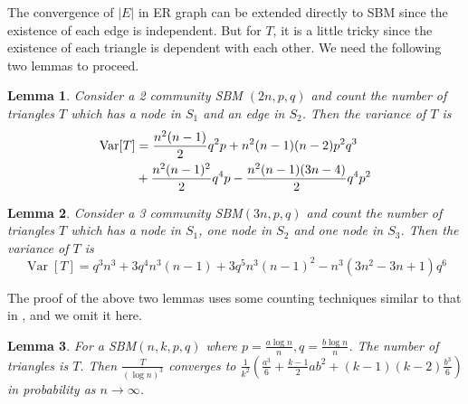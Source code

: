 \documentclass[journal]{IEEEtran}
\newtheorem{lemma}{Lemma}
\newcommand{\1}{\mathbbm{1}}
\DeclareMathOperator{\Var}{Var}
\begin{document}
The convergence of $|E|$ in ER graph can be extended directly to SBM since the existence of each edge is independent.
But for $T$, it is a little tricky since the existence of each triangle is dependent with each other.  We need the following two lemmas
to proceed.
\begin{lemma}\label{lem:SBM_tr_counting_cross}
	Consider a 2 community SBM $(2n, p, q)$ and count the number of triangles $T$ which has a node in $S_1$ and an edge in $S_2$.
Then the variance of $T$ is
\begin{align}
\Var[T] & = \frac{n^2(n-1)}{2}q^2p + n^2(n-1)(n-2)p^2q^3 \notag \\
& + \frac{n^2(n-1)^2}{2}q^4p - \frac{n^2(n-1)(3n-4)}{2}q^4 p^2 \label{eq:SBM_tr_counting_cross}
\end{align}
\end{lemma}
\begin{lemma}\label{lem:SBM_tr_counting_3}
	Consider a 3 community SBM$(3n, p, q)$ and count the number of triangles $T$ which has a node in $S_1$, one node in $S_2$ and one node in $S_3$.
	Then the variance of $T$ is
	\begin{equation*}\label{eq:SBM_tr_counting_three}
	\Var[T] = q^3 n^3 + 3q^4 n^3(n-1) + 3q^5 n^3 (n-1)^2 - n^3(3n^2-3n+1)q^6
	\end{equation*}
\end{lemma}
The proof of the above two lemmas uses some counting techniques similar to that in \cite{holland1977method}, and we omit it here.
\begin{lemma}\label{lem:sbmV}
	For a SBM$(n, k, p, q)$ where $p=\frac{a\log n}{n}, q = \frac{b\log n}{n}$. The number of triangles is $T$.
	Then $\frac{T}{(\log n)^3}$ converges to $\frac{1}{k^2}(\frac{a^3}{6} + \frac{k-1}{2}ab^2 + (k-1)(k-2)\frac{b^3}{6} )$ in probability as $n \to \infty$.
\end{lemma}
\end{document}

